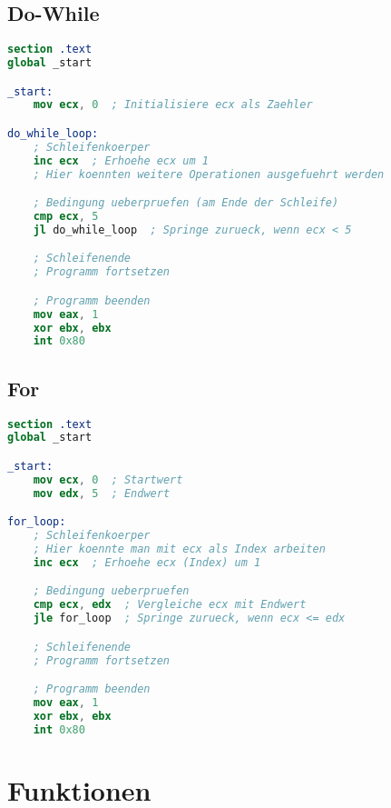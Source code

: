 \documentclass[a4paper,12pt,twoside]{article}
\begin{document}
\subsection{Do-While}
\begin{center}
  \begin{minipage}{1.0\textwidth}
    \begin{lstlisting}[language=NASM]
section .text
global _start

_start:
    mov ecx, 0  ; Initialisiere ecx als Zaehler

do_while_loop:
    ; Schleifenkoerper
    inc ecx  ; Erhoehe ecx um 1
    ; Hier koennten weitere Operationen ausgefuehrt werden

    ; Bedingung ueberpruefen (am Ende der Schleife)
    cmp ecx, 5
    jl do_while_loop  ; Springe zurueck, wenn ecx < 5

    ; Schleifenende
    ; Programm fortsetzen

    ; Programm beenden
    mov eax, 1
    xor ebx, ebx
    int 0x80
    \end{lstlisting}
  \end{minipage}
\end{center}
\subsection{For}
\begin{center}
  \begin{minipage}{1.0\textwidth}
    \begin{lstlisting}[language=NASM]
section .text
global _start

_start:
    mov ecx, 0  ; Startwert
    mov edx, 5  ; Endwert

for_loop:
    ; Schleifenkoerper
    ; Hier koennte man mit ecx als Index arbeiten
    inc ecx  ; Erhoehe ecx (Index) um 1

    ; Bedingung ueberpruefen
    cmp ecx, edx  ; Vergleiche ecx mit Endwert
    jle for_loop  ; Springe zurueck, wenn ecx <= edx

    ; Schleifenende
    ; Programm fortsetzen

    ; Programm beenden
    mov eax, 1
    xor ebx, ebx
    int 0x80
    \end{lstlisting}
  \end{minipage}
\end{center}
\section{Funktionen}
\end{document}
